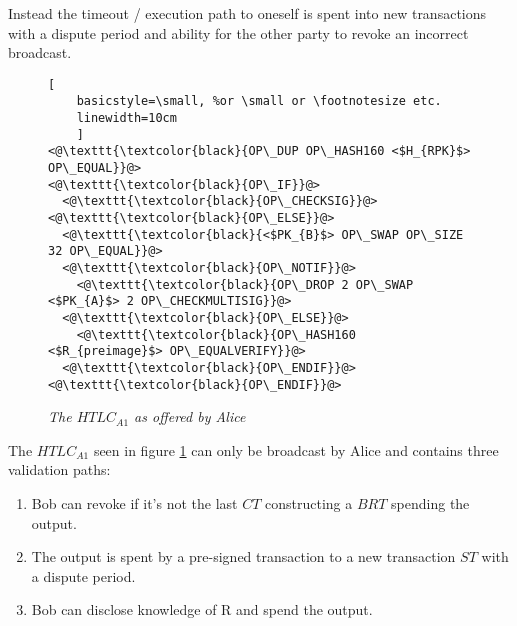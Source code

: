 Instead the timeout / execution path to oneself is spent into new transactions with a dispute period and ability for the other party to revoke an incorrect broadcast. 

\begin{figure}[hbt!]

	\centering

	\begin{lstlisting}[
	basicstyle=\small, %or \small or \footnotesize etc.
	linewidth=10cm
	]
<@\texttt{\textcolor{black}{OP\_DUP OP\_HASH160 <$H_{RPK}$> OP\_EQUAL}}@>
<@\texttt{\textcolor{black}{OP\_IF}}@>
  <@\texttt{\textcolor{black}{OP\_CHECKSIG}}@>
<@\texttt{\textcolor{black}{OP\_ELSE}}@>
  <@\texttt{\textcolor{black}{<$PK_{B}$> OP\_SWAP OP\_SIZE 32 OP\_EQUAL}}@>
  <@\texttt{\textcolor{black}{OP\_NOTIF}}@>
    <@\texttt{\textcolor{black}{OP\_DROP 2 OP\_SWAP <$PK_{A}$> 2 OP\_CHECKMULTISIG}}@>  
  <@\texttt{\textcolor{black}{OP\_ELSE}}@> 
    <@\texttt{\textcolor{black}{OP\_HASH160 <$R_{preimage}$> OP\_EQUALVERIFY}}@> 
  <@\texttt{\textcolor{black}{OP\_ENDIF}}@>
<@\texttt{\textcolor{black}{OP\_ENDIF}}@>
	\end{lstlisting}
	
	\caption{\textit{ The $HTLC_{A1}$ as offered by Alice
	}}
	\label{fig:alice:HTLC}
\end{figure}

The $HTLC_{A1}$ seen in figure \ref{fig:alice:HTLC} can only be broadcast by Alice and contains three validation paths:

\begin{enumerate}
	\item Bob can revoke if it's not the last $CT$ constructing a $BRT$ spending the output.
	\item The output is spent by a pre-signed transaction to a new transaction $ST$ with a dispute period.
	\item Bob can disclose knowledge of R and spend the output.
\end{enumerate}

